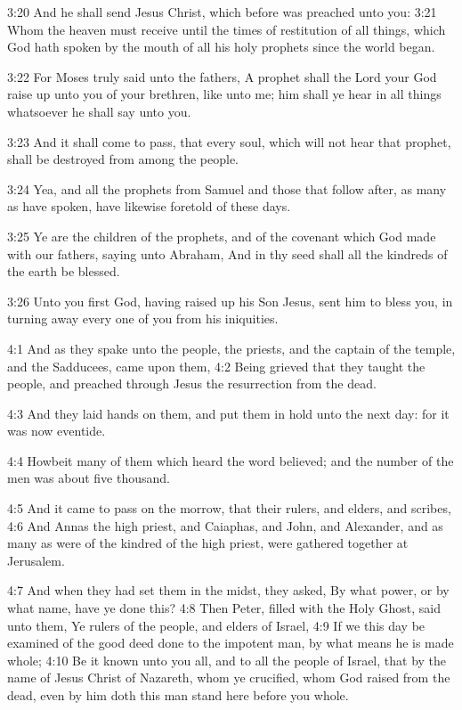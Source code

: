 3:20 And he shall send Jesus Christ, which before was preached unto you: 3:21 Whom the heaven must receive until the times of restitution of all things, which God hath spoken by the mouth of all his holy prophets since the world began.

3:22 For Moses truly said unto the fathers, A prophet shall the Lord your God raise up unto you of your brethren, like unto me; him shall ye hear in all things whatsoever he shall say unto you.

3:23 And it shall come to pass, that every soul, which will not hear that prophet, shall be destroyed from among the people.

3:24 Yea, and all the prophets from Samuel and those that follow after, as many as have spoken, have likewise foretold of these days.

3:25 Ye are the children of the prophets, and of the covenant which God made with our fathers, saying unto Abraham, And in thy seed shall all the kindreds of the earth be blessed.

3:26 Unto you first God, having raised up his Son Jesus, sent him to bless you, in turning away every one of you from his iniquities.

4:1 And as they spake unto the people, the priests, and the captain of the temple, and the Sadducees, came upon them, 4:2 Being grieved that they taught the people, and preached through Jesus the resurrection from the dead.

4:3 And they laid hands on them, and put them in hold unto the next day: for it was now eventide.

4:4 Howbeit many of them which heard the word believed; and the number of the men was about five thousand.

4:5 And it came to pass on the morrow, that their rulers, and elders, and scribes, 4:6 And Annas the high priest, and Caiaphas, and John, and Alexander, and as many as were of the kindred of the high priest, were gathered together at Jerusalem.

4:7 And when they had set them in the midst, they asked, By what power, or by what name, have ye done this?  4:8 Then Peter, filled with the Holy Ghost, said unto them, Ye rulers of the people, and elders of Israel, 4:9 If we this day be examined of the good deed done to the impotent man, by what means he is made whole; 4:10 Be it known unto you all, and to all the people of Israel, that by the name of Jesus Christ of Nazareth, whom ye crucified, whom God raised from the dead, even by him doth this man stand here before you whole.

